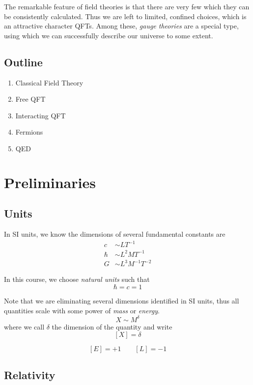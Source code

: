 \documentclass[a4paper,11pt]{article}
\begin{document}
	The remarkable feature of field theories is that there are very few which they can be consistently calculated. Thus we are left to limited, confined choices, which is an attractive character QFTs. Among these, \emph{gauge theories} are a special type, using which we can successfully describe our universe to some extent.

	\subsection*{Outline}
	\begin{enumerate}
		\item Classical Field Theory
		\item Free QFT
		\item Interacting QFT
		\item Fermions
		\item QED
	\end{enumerate}

	\newpage
	
	\tableofcontents
	\newpage
	\maintext
	\setcounter{section}{-1}
	\section{Preliminaries}
	\subsection{Units}
	In SI units, we know the dimensions of several fundamental constants are
	\begin{align*}
		c & \sim LT^{-1}\\
		\hbar & \sim L^2 M T^{-1}\\
		G & \sim L^3 M^{-1} T^{-2}
	\end{align*}

	In this course, we choose \emph{natural units} such that
	\[
		\hbar = c = 1
	\]
	
	Note that we are eliminating several dimensions identified in SI units, thus all quantities scale with some power of \emph{mass} or \emph{energy}.
	\[
		X \sim M^\delta
	\]
	where we call $\delta$ the dimension of the quantity and write
	\[
		[X] = \delta
	\]
	
	\begin{ex}
		\[
			[E] = +1 \qquad [L] = -1
		\]
	\end{ex}

	\subsection{Relativity}
\end{document}
